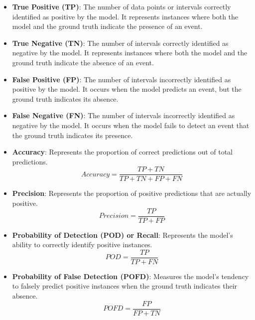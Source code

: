 \begin{itemize}
    \item \textbf{True Positive (TP)}: The number of data points or intervals correctly identified as positive by the model. It represents instances where both the model and the ground truth indicate the presence of an event.
    
    \item \textbf{True Negative (TN)}: The number of intervals correctly identified as negative by the model. It represents instances where both the model and the ground truth indicate the absence of an event.

    \item \textbf{False Positive (FP)}: The number of intervals incorrectly identified as positive by the model. It occurs when the model predicts an event, but the ground truth indicates its absence.

    \item \textbf{False Negative (FN)}: The number of intervals incorrectly identified as negative by the model. It occurs when the model fails to detect an event that the ground truth indicates its presence.

    \item \textbf{Accuracy}: Represents the proportion of correct predictions out of total predictions.
    \begin{equation}
        Accuracy = \frac{TP + TN}{TP + TN + FP + FN}
    \end{equation}

    \item \textbf{Precision}: Represents the proportion of positive predictions that are actually positive.
    \begin{equation}
        Precision = \frac{TP}{TP + FP}
    \end{equation}
    
    \item \textbf{Probability of Detection (POD) or Recall}: Represents the model's ability to correctly identify positive instances.
    \begin{equation}
        POD = \frac{TP}{TP + FN}
    \end{equation}

    \item \textbf{Probability of False Detection (POFD)}: Measures the model's tendency to falsely predict positive instances when the ground truth indicates their absence.
    \begin{equation}
        POFD = \frac{FP}{FP + TN}
    \end{equation}


\end{itemize}
